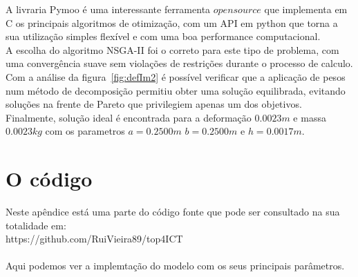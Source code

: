 \documentclass[a4paper,12pt]{article}
\begin{document}
A livraria Pymoo é uma interessante ferramenta $open source$ que implementa em C os principais algoritmos de otimização, com um API em python que torna a sua utilização simples flexível e com uma boa performance computacional.\\
A escolha do algoritmo NSGA-II foi o correto para este tipo de problema, com uma convergência suave sem violações de restrições durante o processo de calculo.\\
Com a análise da figura~\ref{fig:defIm2} é possível verificar que a aplicação de pesos num método de decomposição permitiu obter uma solução equilibrada, evitando soluções na frente de Pareto que privilegiem apenas um dos objetivos.\\
Finalmente, solução ideal é encontrada para a deformação $0.0023m$ e massa $0.0023kg$ com os parametros $a=0.2500m$ $b=0.2500m$ e $h=0.0017m$.

\newpage

\appendix

\section{O código}\label{A:1}

Neste apêndice está uma parte do código fonte que pode ser consultado na sua totalidade em:\\ https://github.com/RuiVieira89/top4ICT\\
\\
Aqui podemos ver a implemtação do modelo com os seus principais parâmetros.
\end{document}
